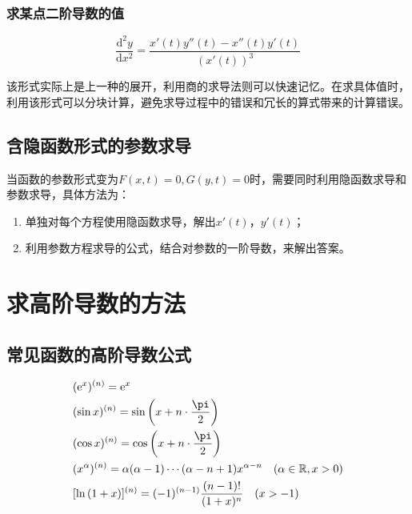 \subsubsection{求某点二阶导数的值}

\begin{equation}
	\frac{\mathrm{d}^2y}{\mathrm{d}x^2}=\frac{x'(t)y''(t)-x''(t)y'(t)}{(x'(t))^3}\label{eq:2.9}
\end{equation}

\begin{remark}
	该形式实际上是上一种的展开，利用商的求导法则可以快速记忆。在求具体值时，利用该形式可以分块计算，避免求导过程中的错误和冗长的算式带来的计算错误。
\end{remark}

\subsection{含隐函数形式的参数求导}\label{sec:2.8.3}
当函数的参数形式变为$F(x,t)=0, G(y,t)=0$时，需要同时利用隐函数求导和参数求导，具体方法为：

\begin{enumerate}
	\item 单独对每个方程使用隐函数求导，解出$x'(t)$，$y'(t)$；
	\item 利用参数方程求导的公式，结合对参数的一阶导数，来解出答案。
\end{enumerate}

\section{求高阶导数的方法}\label{sec:2.9}

\subsection{常见函数的高阶导数公式}\label{sec:2.9.1}

\begin{equation}
	\begin{split}
		&({\rm e}^x)^{(n)} = {\rm e}^x\\
		&(\sin{x})^{(n)} = \sin{\qty(x+n\cdot \frac{\pi}{2})}\\
		&(\cos{x})^{(n)}=\cos{\qty(x+n\cdot \frac{\pi}{2})}\\
		&(x^{\alpha})^{(n)}=\alpha (\alpha -1)\cdots (\alpha -n+1)x^{\alpha -n}\quad (\alpha\in{\mathbb{R}},x>0)\\
		&[\ln{(1+x)}]^{(n)}=(-1)^{(n-1)}\frac{(n-1)!}{(1+x)^n}\quad (x>-1)
	\end{split}\label{eq:2.10}
\end{equation}

